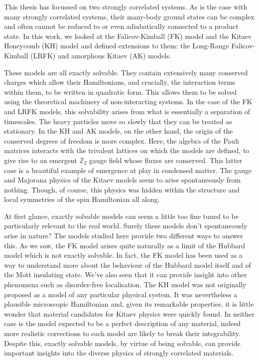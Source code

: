 This thesis has focussed on two strongly correlated systems. As is the case with many strongly correlated systems, their many-body ground states can be complex and often cannot be reduced to or even adiabatically connected to a product state. In this work, we looked at the Falicov-Kimball (FK) model and the Kitaev Honeycomb (KH) model and defined extensions to them: the Long-Range Falicov-Kimball (LRFK) and amorphous Kitaev (AK) models.

These models are all exactly solvable. They contain extensively many conserved charges which allow their Hamiltonians, and crucially, the interaction terms within them, to be written in quadratic form. This allows them to be solved using the theoretical machinery of non-interacting systems. In the case of the FK and LRFK models, this solvability arises from what is essentially a separation of timescales. The heavy particles move so slowly that they can be treated as stationary. In the KH and AK models, on the other hand, the origin of the conserved degrees of freedom is more complex. Here, the algebra of the Pauli matrices interacts with the trivalent lattices on which the models are defined, to give rise to an emergent \(\mathbb{Z}_2\) gauge field whose fluxes are conserved. This latter case is a beautiful example of emergence at play in condensed matter. The gauge and Majorana physics of the Kitaev models seem to arise spontaneously from nothing. Though, of course, this physics was hidden within the structure and local symmetries of the spin Hamiltonian all along.

At first glance, exactly solvable models can seem a little too fine tuned to be particularly relevant to the real world. Surely these models don't spontaneously arise in nature? The models studied here provide two different ways to answer this. As we saw, the FK model arises quite naturally as a limit of the Hubbard model which is not exactly solvable. In fact, the FK model has been used as a way to understand more about the behaviour of the Hubbard model itself and of the Mott insulating state. We've also seen that it can provide insight into other phenomena such as disorder-free localisation. The KH model was not originally proposed as a model of any particular physical system. It was nevertheless a plausible microscopic Hamiltonian and, given its remarkable properties, it is little wonder that material candidates for Kitaev physics were quickly found. In neither case is the model expected to be a perfect description of any material, indeed more realistic corrections to each model are likely to break their integrability. Despite this, exactly solvable models, by virtue of being solvable, can provide important insights into the diverse physics of strongly correlated materials.


